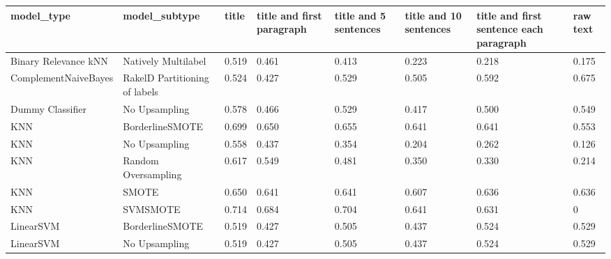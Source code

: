 \begin{tabular}{llllllll}
\toprule
                     model\_type &                 model\_subtype & title & title and first paragraph & title and 5 sentences & title and 10 sentences & title and first sentence each paragraph &  raw text \\
\midrule
           Binary Relevance kNN &           Natively Multilabel & 0.519 &                     0.461 &                 0.413 &                  0.223 &                                   0.218 &     0.175 \\
           ComplementNaiveBayes & RakelD Partitioning of labels & 0.524 &                     0.427 &                 0.529 &                  0.505 &                                   0.592 &     0.675 \\
               Dummy Classifier &                 No Upsampling & 0.578 &                     0.466 &                 0.529 &                  0.417 &                                   0.500 &     0.549 \\
                            KNN &               BorderlineSMOTE & 0.699 &                     0.650 &                 0.655 &                  0.641 &                                   0.641 &     0.553 \\
                            KNN &                 No Upsampling & 0.558 &                     0.437 &                 0.354 &                  0.204 &                                   0.262 &     0.126 \\
                            KNN &           Random Oversampling & 0.617 &                     0.549 &                 0.481 &                  0.350 &                                   0.330 &     0.214 \\
                            KNN &                         SMOTE & 0.650 &                     0.641 &                 0.641 &                  0.607 &                                   0.636 &     0.636 \\
                            KNN &                      SVMSMOTE & 0.714 &                     0.684 &                 0.704 &                  0.641 &                                   0.631 &         0 \\
                      LinearSVM &               BorderlineSMOTE & 0.519 &                     0.427 &                 0.505 &                  0.437 &                                   0.524 &     0.529 \\
                      LinearSVM &                 No Upsampling & 0.519 &                     0.427 &                 0.505 &                  0.437 &                                   0.524 &     0.529 \\

\end{tabular}
